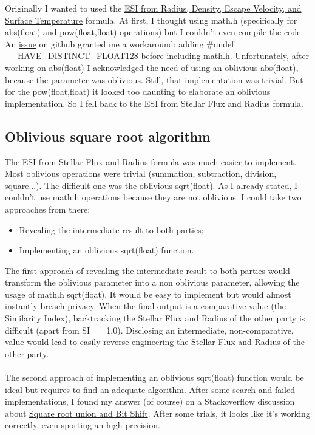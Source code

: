 \documentclass[a4paper]{article}
\begin{document}
Originally I wanted to used the \href{http://phl.upr.edu/projects/earth-similarity-index-esi}{ESI from Radius, Density, Escape Velocity, and Surface Temperature} formula. At first, I thought using math.h (specifically for abs(float) and pow(float,float) operations) but I couldn't even compile the code. An \href{https://github.com/samee/obliv-c/issues/48}{issue} on github granted me a workaround: adding \#undef \_\_HAVE\_DISTINCT\_FLOAT128 before including math.h. Unfortunately, after working on abs(float) I acknowledged the need of using an oblivious abs(float), because the parameter was oblivious. Still, that implementation was trivial. But for the pow(float,float) it looked too daunting to elaborate an oblivious implementation. So I fell back to the \href{http://phl.upr.edu/projects/earth-similarity-index-esi}{ESI from Stellar Flux and Radius} formula.

\subsection{Oblivious square root algorithm}

The \href{http://phl.upr.edu/projects/earth-similarity-index-esi}{ESI from Stellar Flux and Radius} formula was much easier to implement. Most oblivious operations were trivial (summation, subtraction, division, square...). The difficult one was the oblivious sqrt(float). As I already stated, I couldn't use math.h operations because they are not oblivious. I could take two approaches from there:

\begin{itemize}
    \item Revealing the intermediate result to both parties;
    \item Implementing an oblivious sqrt(float) function.
\end{itemize}

The first approach of revealing the intermediate result to both parties would transform the oblivious parameter into a non oblivious parameter, allowing the usage of math.h sqrt(float). It would be easy to implement but would almost instantly breach privacy. When the final output is a comparative value (the Similarity Index), backtracking the Stellar Flux and Radius of the other party is difficult (apart from SI ~= 1.0). Disclosing an intermediate, non-comparative, value would lead to easily reverse engineering the Stellar Flux and Radius of the other party.
\\
\\
The second approach of implementing an oblivious sqrt(float) function would be ideal but requires to find an adequate algorithm. After some search and failed implementations, I found my answer (of course) on a Stackoverflow discussion about \href{https://stackoverflow.com/questions/28264277/square-root-union-and-bit-shift}{Square root union and Bit Shift}. After some trials, it looks like it's working correctly, even sporting an high precision. 
\end{document}
